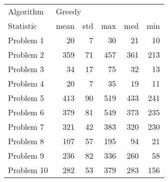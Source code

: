 \begin{tabular}{lrrrrr}
\toprule
Algorithm & \multicolumn{5}{l}{Greedy} \\
Statistic &   mean & std &  max &  med &  min \\
\midrule
Problem 1  &     20 &   7 &   30 &   21 &   10 \\
Problem 2  &    359 &  71 &  457 &  361 &  213 \\
Problem 3  &     34 &  17 &   75 &   32 &   13 \\
Problem 4  &     20 &   7 &   35 &   19 &   11 \\
Problem 5  &    413 &  90 &  519 &  433 &  241 \\
Problem 6  &    379 &  81 &  549 &  373 &  235 \\
Problem 7  &    321 &  42 &  383 &  320 &  230 \\
Problem 8  &    107 &  57 &  195 &   94 &   21 \\
Problem 9  &    236 &  82 &  336 &  260 &   58 \\
Problem 10 &    282 &  53 &  379 &  283 &  156 \\
\bottomrule
\end{tabular}
